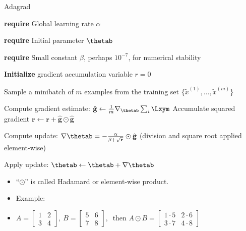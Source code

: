 \begin{vbframe}{Adagrad}
  
  \begin{algorithm}[H]
    \small
    \caption{Adagrad}
    \begin{algorithmic}[1]
    \scriptsize 
    \State \textbf{require} Global learning rate $\alpha$ \strut
    \State \textbf{require} Initial parameter $\thetab$ \strut
    \State \textbf{require} Small constant $\beta$, perhaps $10^{-7}$, for numerical stability \strut
    \State \textbf{Initialize} gradient accumulation variable $r = 0$
         \State \parbox[t]{\dimexpr\linewidth-\algorithmicindent}{Sample a minibatch of $m$ examples from the training set $\{\tilde{x}^{(1)},\dots,\tilde{x}^{(m)}\}$ \strut}
         \State Compute gradient estimate: $\hat{\mathbf{g}} \leftarrow \frac{1}{m} \nabla_{\thetab} \sum_{i} \Lxym$
         \State Accumulate squared gradient $\mathbf{r} \leftarrow \mathbf{r} + \hat{\mathbf{g}} \odot  \hat{\mathbf{g}}$
         \State \parbox[t]{\dimexpr\linewidth-\algorithmicindent}{Compute update: $\nabla \thetab = - \frac{\alpha}{\beta + \sqrt\mathbf{r}} \odot \hat{\mathbf{g}}$ (division and square root applied element-wise) \strut}
         \State Apply update: $\thetab \leftarrow \thetab + \nabla\thetab$
       \EndWhile
    \end{algorithmic}
  \end{algorithm}
  \begin{itemize}
  \small
    \item \enquote{$\odot$} is called Hadamard or element-wise product.
    \item Example:
    \vspace{0.2cm}
    \item[] $A =
            \begin{bmatrix}
              1 & 2 \\
              3 & 4
            \end{bmatrix}, \ 
            B =
            \begin{bmatrix}
              5 & 6 \\
              7 & 8
            \end{bmatrix}, \ \text{ then } A \odot B =
            \begin{bmatrix}
              1 \cdot 5 & 2 \cdot 6 \\
              3 \cdot 7 & 4 \cdot 8
            \end{bmatrix}$
  \end{itemize}
\end{vbframe}

